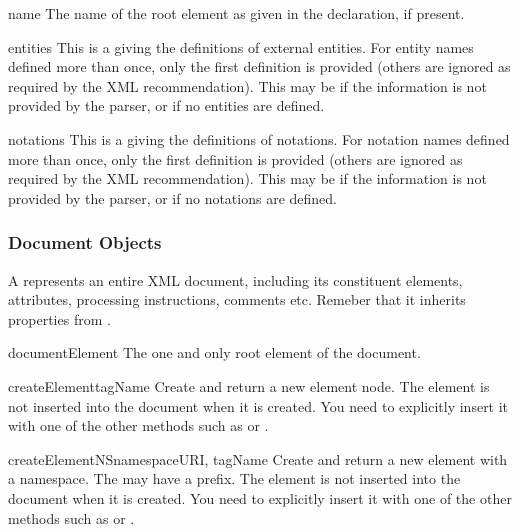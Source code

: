 \begin{memberdesc}[DocumentType]{name}
  The name of the root element as given in the 
  declaration, if present.
\end{memberdesc}

\begin{memberdesc}[DocumentType]{entities}
  This is a  giving the definitions of external
  entities.  For entity names defined more than once, only the first
  definition is provided (others are ignored as required by the XML
  recommendation).  This may be  if the information is not
  provided by the parser, or if no entities are defined.
\end{memberdesc}

\begin{memberdesc}[DocumentType]{notations}
  This is a  giving the definitions of notations.
  For notation names defined more than once, only the first definition
  is provided (others are ignored as required by the XML
  recommendation).  This may be  if the information is not
  provided by the parser, or if no notations are defined.
\end{memberdesc}


\subsubsection{Document Objects \label{dom-document-objects}}

A  represents an entire XML document, including its
constituent elements, attributes, processing instructions, comments
etc.  Remeber that it inherits properties from .

\begin{memberdesc}[Document]{documentElement}
The one and only root element of the document.
\end{memberdesc}

\begin{methoddesc}[Document]{createElement}{tagName}
Create and return a new element node.  The element is not inserted
into the document when it is created.  You need to explicitly insert
it with one of the other methods such as  or
.
\end{methoddesc}

\begin{methoddesc}[Document]{createElementNS}{namespaceURI, tagName}
Create and return a new element with a namespace.  The
 may have a prefix.  The element is not inserted into the
document when it is created.  You need to explicitly insert it with
one of the other methods such as  or
.
\end{methoddesc}

